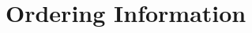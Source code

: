 \documentclass[letterpaper,twoside,onecolumn,openright,final]{memoir}
\begin{document}
\backmatter
\appendix
\renewcommand\thechapter{A}
\chapter{Ordering Information}\label{ch:ordering}

\end{document}
